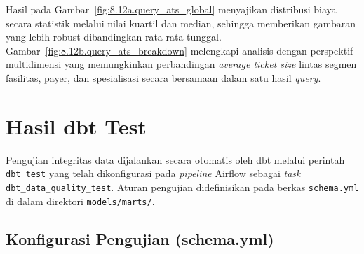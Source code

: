 Hasil pada Gambar~\ref{fig:8.12a.query_ats_global} menyajikan distribusi biaya secara
statistik melalui nilai kuartil dan median, sehingga memberikan gambaran yang lebih
robust dibandingkan rata-rata tunggal. Gambar~\ref{fig:8.12b.query_ats_breakdown}
melengkapi analisis dengan perspektif multidimensi yang memungkinkan perbandingan
\textit{average ticket size} lintas segmen fasilitas, payer, dan spesialisasi secara
bersamaan dalam satu hasil \textit{query}.

\section{Hasil dbt Test}
 
Pengujian integritas data dijalankan secara otomatis oleh dbt melalui perintah \texttt{dbt test} yang telah dikonfigurasi pada \textit{pipeline} Airflow sebagai \textit{task} \texttt{dbt\_data\_quality\_test}. Aturan pengujian didefinisikan pada berkas \texttt{schema.yml} di dalam direktori \texttt{models/marts/}.
\clearpage 
\subsection{Konfigurasi Pengujian (schema.yml)}
 
